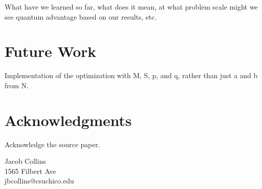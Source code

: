 \documentclass[twocolumn]{cinc}
\begin{document}
What have we learned so far, what does it mean, at what problem scale might
we see quantum advantage based on our results, etc.

\section{Future Work}
 
Implementation of the optimization with M, S, p, and q, rather than just 
a and b from N.

\balance

\section*{Acknowledgments}  
% 
Acknowledge the source paper.





  
  
      


\begin{correspondence}
Jacob Collins\\
1565 Filbert Ave\\
jbcollins@csuchico.edu
\end{correspondence}
\end{document}
